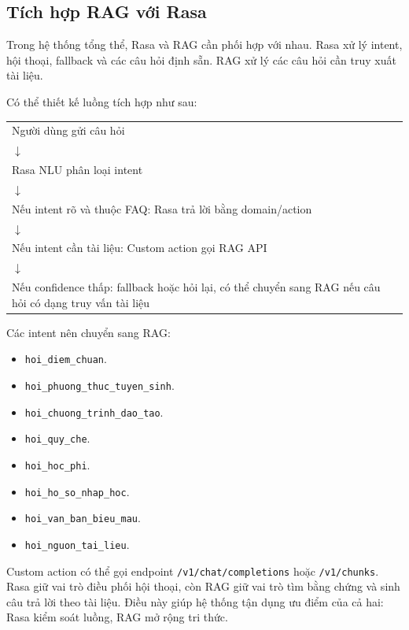 \subsection{Tích hợp RAG với Rasa}

Trong hệ thống tổng thể, Rasa và RAG cần phối hợp với nhau. Rasa xử lý intent, hội thoại, fallback và các câu hỏi định sẵn. RAG xử lý các câu hỏi cần truy xuất tài liệu.

Có thể thiết kế luồng tích hợp như sau:

\begin{center}
\begin{tabular}{p{12cm}}
Người dùng gửi câu hỏi \\
$\downarrow$ \\
Rasa NLU phân loại intent \\
$\downarrow$ \\
Nếu intent rõ và thuộc FAQ: Rasa trả lời bằng domain/action \\
$\downarrow$ \\
Nếu intent cần tài liệu: Custom action gọi RAG API \\
$\downarrow$ \\
Nếu confidence thấp: fallback hoặc hỏi lại, có thể chuyển sang RAG nếu câu hỏi có dạng truy vấn tài liệu
\end{tabular}
\end{center}

Các intent nên chuyển sang RAG:

\begin{itemize}
    \item \texttt{hoi\_diem\_chuan}.
    \item \texttt{hoi\_phuong\_thuc\_tuyen\_sinh}.
    \item \texttt{hoi\_chuong\_trinh\_dao\_tao}.
    \item \texttt{hoi\_quy\_che}.
    \item \texttt{hoi\_hoc\_phi}.
    \item \texttt{hoi\_ho\_so\_nhap\_hoc}.
    \item \texttt{hoi\_van\_ban\_bieu\_mau}.
    \item \texttt{hoi\_nguon\_tai\_lieu}.
\end{itemize}

Custom action có thể gọi endpoint \texttt{/v1/chat/completions} hoặc \texttt{/v1/chunks}. Rasa giữ vai trò điều phối hội thoại, còn RAG giữ vai trò tìm bằng chứng và sinh câu trả lời theo tài liệu. Điều này giúp hệ thống tận dụng ưu điểm của cả hai: Rasa kiểm soát luồng, RAG mở rộng tri thức.
